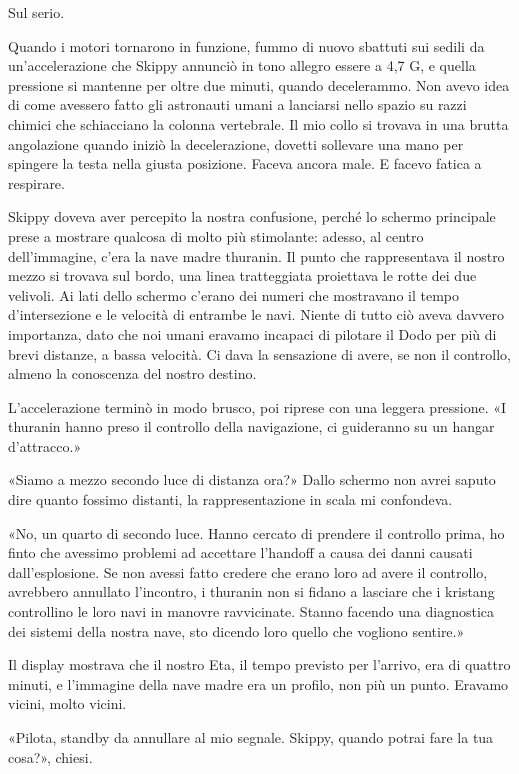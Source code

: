 Sul serio.

Quando i motori tornarono in funzione, fummo di nuovo sbattuti sui
sedili da un'accelerazione che Skippy annunciò in tono allegro essere a
4,7 G, e quella pressione si mantenne per oltre due minuti, quando
decelerammo. Non avevo idea di come avessero fatto gli astronauti umani
a lanciarsi nello spazio su razzi chimici che schiacciano la colonna
vertebrale. Il mio collo si trovava in una brutta angolazione quando
iniziò la decelerazione, dovetti sollevare una mano per spingere la
testa nella giusta posizione. Faceva ancora male. E facevo fatica a
respirare.

Skippy doveva aver percepito la nostra confusione, perché lo schermo
principale prese a mostrare qualcosa di molto più stimolante: adesso, al
centro dell'immagine, c'era la nave madre thuranin. Il punto che
rappresentava il nostro mezzo si trovava sul bordo, una linea
tratteggiata proiettava le rotte dei due velivoli. Ai lati dello schermo
c'erano dei numeri che mostravano il tempo d'intersezione e le velocità
di entrambe le navi. Niente di tutto ciò aveva davvero importanza, dato
che noi umani eravamo incapaci di pilotare il Dodo per più di brevi
distanze, a bassa velocità. Ci dava la sensazione di avere, se non il
controllo, almeno la conoscenza del nostro destino.

L'accelerazione terminò in modo brusco, poi riprese con una leggera
pressione. «I thuranin hanno preso il controllo della navigazione, ci
guideranno su un hangar d'attracco.»

«Siamo a mezzo secondo luce di distanza ora?» Dallo schermo non avrei
saputo dire quanto fossimo distanti, la rappresentazione in scala mi
confondeva.

«No, un quarto di secondo luce. Hanno cercato di prendere il controllo
prima, ho finto che avessimo problemi ad accettare l'handoff a causa dei
danni causati dall'esplosione. Se non avessi fatto credere che erano
loro ad avere il controllo, avrebbero annullato l'incontro, i thuranin
non si fidano a lasciare che i kristang controllino le loro navi in
manovre ravvicinate. Stanno facendo una diagnostica dei sistemi della
nostra nave, sto dicendo loro quello che vogliono sentire.»

Il display mostrava che il nostro Eta, il tempo previsto per l'arrivo,
era di quattro minuti, e l'immagine della nave madre era un profilo, non
più un punto. Eravamo vicini, molto vicini.

«Pilota, standby da annullare al mio segnale. Skippy, quando potrai fare
la tua cosa?», chiesi.

